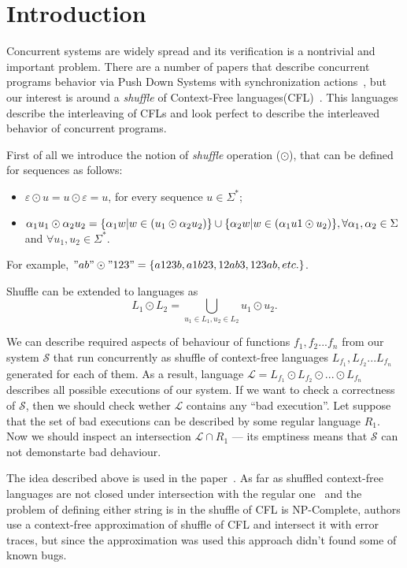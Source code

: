 \section{Introduction}

Concurrent systems are widely spread and its verification is a nontrivial and important problem.
There are a number of papers that describe concurrent programs behavior via Push Down Systems with synchronization actions~\cite{!!!}, but our interest is around a \textit{shuffle} of Context-Free languages(CFL)~\cite{!!!}.
This languages describe the interleaving of CFLs and look perfect to describe the interleaved behavior of concurrent programs.

First of all we introduce the notion of \textit{shuffle} operation ($\odot$), that can be defined for sequences as follows:
\begin{itemize}
    \item $\varepsilon \odot u = u \odot \varepsilon = {u}$, for every sequence $ u \in \Sigma^*$;
    \item $\alpha_1 u_1 \odot \alpha_2 u_2 = \{\alpha_1 w | w \in (u_1 \odot \alpha_2 u_2) \} \cup \newline
    \{\alpha_2 w | w \in (\alpha_1 u1 \odot u_2 ) \},  \forall \alpha_1, \alpha_2 \in \Sigma$ and $\forall u_1, u_2 \in \Sigma^*$.
\end{itemize}
For example, $"ab" \odot "123" = \{a123b,a1b23, 12ab3, 123ab, etc.\}$.

Shuffle can be extended to languages as $$L_1 \odot L_2 = \bigcup\limits_{u_1\in L_1, u_2\in L_2} u_1 \odot u_2.$$

We can describe required aspects of behaviour of functions $f_1, f_2 ... f_n$ from our system $\mathcal{S}$ that run concurrently as shuffle of context-free languages $L_{f_1}, L_{f_2} ... L_{f_n}$ generated for each of them.
As a result, language  $\mathcal{L} = L_{f_1} \odot L_{f_2} \odot... \odot L_{f_n}$ describes all possible executions of our system.
If we want to check a correctness of $\mathcal{S}$, then we should check wether $\mathcal{L}$ contains any ``bad execution''.
Let suppose that the set of bad executions can be described by some regular language $R_1$.
Now we should inspect an intersection $\mathcal{L} \cap R_1$ --- its emptiness means that $\mathcal{S}$ can not demonstarte bad dehaviour.

The idea described above is used in the paper~\cite{stenman2011approximating}. 
As far as shuffled context-free languages are not closed under intersection with the regular one~\cite{!!!} and the problem of defining either string is in the shuffle of CFL is NP-Complete,
 authors use a context-free approximation of shuffle of CFL and intersect it with error traces, but since the approximation was used this approach didn't found some of known bugs. 

